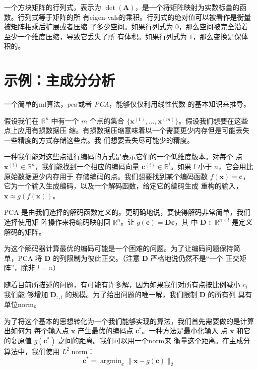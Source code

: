 一个方块矩阵的行列式，表示为
$\det(\pmb{A})$，是一个将矩阵映射为实数标量的函数。行列式等于矩阵的所
有\gls*{eigen-vals}的乘积。行列式的绝对值可以被看作是衡量被矩阵相乘后扩展或者压缩
了多少空间。如果行列式为 $0$，那么空间被完全沿着至少一个维度压缩，导致它丢失了所
有体积。如果行列式为 $1$，那么变换是保体积的。

\section{示例：主成分分析}
\label{sec:example:principal_components_analysis}

一个简单的\gls*{ml}算法，\emph{\gls{pca}}\,或者 \emph{PCA}，能够仅仅利用线性代数
的基本知识来推导。

假设我们在 $\mathbb{R}^n$ 中有一个 $m$ 个点的集合
$\{\pmb{x}^{(1)}, \ldots, \pmb{x}^{(m)}\}$。假设我们想要在这些点上应用有损数据压
缩。有损数据压缩意味着以一个需要更少内存但是可能丢失一些精度的方式存储这些点。我
们想要丢失尽可能少的精度。

一种我们能对这些点进行编码的方式是表示它们的一个低维度版本。对每个
点 $\pmb{x}^{(i)} \in \mathbb{R}^n$，我们能找到一个相应的编码向量
$\pmb{c}^{(i)} \in \mathbb{R}^l$。如果 $l$ 小于 $n$，它会用比原始数据更少内存用于
存储编码的点。我们想要找到某个编码函数
$f(\pmb{x}) = \pmb{c}$，它为一个输入生成编码，以及一个解码函数，给定它的编码生成
重构的输入，$\pmb{x} \approx g(f(\pmb{x}))$。

PCA 是由我们选择的解码函数定义的。更明确地说，要使得解码非常简单，我们选择使用矩
阵操作来将编码映射回 $\mathbb{R}^n$。让 $g(\pmb{c}) = \pmb{D}\pmb{c}$，其
中 $\pmb{D} \in \mathbb{R}^{n \times l}$ 是定义解码的矩阵。

为这个解码器计算最优的编码可能是一个困难的问题。为了让编码问题保持简
单，PCA 将 $\pmb{D}$ 的列限制为彼此正交。（注意 $\pmb{D}$ 严格地说仍然不是``一个
正交矩阵''，除非 $l = n$）

随着目前所描述的问题，有可能有许多解，因为如果我们对所有点按比例减小 $c_i$ 我们能
够增加 $\pmb{D}_{:,i}$ 的规模。为了给出问题的唯一解，我们限制 $\pmb{D}$ 的所有列
具有单位\gls*{norm}。

为了将这个基本的思想转化为一个我们能够实现的算法，我们首先需要做的是计算出如何为
每个输入点 $\pmb{x}$ 产生最优的编码点 $\pmb{c}^*$。一种方法是最小化输入
点 $\pmb{x}$ 和它的复原值 $g(\pmb{c}^*)$ 之间的距离。我们可以用一个\gls*{norm}来
衡量这个距离。在主成分算法中，我们使用 $L^2$ \gls*{norm}：
\begin{equation}
  \pmb{c}^* = \mathop{\arg\min}_{\pmb{c}}\|\pmb{x} - g(\pmb{c})\|_2
\end{equation}

